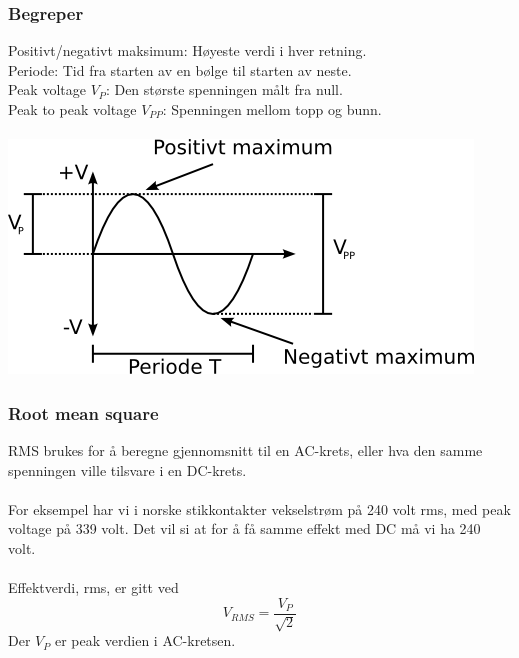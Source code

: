 \subsubsection{Begreper}
Positivt/negativt maksimum: Høyeste verdi i hver retning. \\
Periode: Tid fra starten av en bølge til starten av neste. \\
Peak voltage $V_P$: Den største spenningen målt fra null. \\
Peak to peak voltage $V_{PP}$: Spenningen mellom topp og bunn. \\
\\
\includegraphics[width=\textwidth]{./img/veksel}

\subsubsection{Root mean square}
RMS brukes for å beregne gjennomsnitt til en AC-krets,
eller hva den samme spenningen ville tilsvare i en DC-krets.
\\\\
For eksempel har vi i norske stikkontakter vekselstrøm på 240 volt rms,
med peak voltage på 339 volt.
Det vil si at for å få samme effekt med DC må vi ha 240 volt.
\\\\
Effektverdi, rms, er gitt ved
$$V_{RMS} = \frac{V_P}{\sqrt{2}}$$
Der $V_P$ er peak verdien i AC-kretsen.
